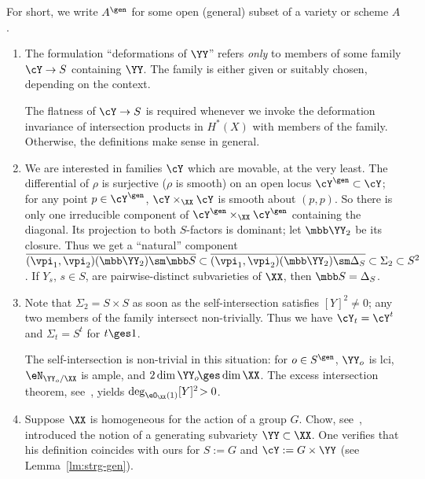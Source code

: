 \begin{m-definition}
\begin{aenum}
\item \label{d:YY-g-e}
  For short, we write $A^\gen$ for some open (general) subset of a variety or scheme $A$.
  \end{aenum}
\end{m-definition}


\begin{m-remark}\label{rmk:G} \leavevmode
  \begin{enumerate}
  \item\label{rmk:G-1} The formulation ``deformations of $\YY$'' refers \emph{only} to members of some family $\cY\to S$ containing $\YY$. The family is either given or suitably chosen, depending on the context. 


The flatness of $\cY\to S$ is required whenever we invoke the deformation invariance of intersection products in $H^*(X)$ with members of the family. Otherwise, the definitions make sense in general. 

\item\label{rmk:G-2} We are interested in families $\cY$ which are movable, at the very least. The differential of $\rho$ is surjective ($\rho$ is smooth) on an open locus $\cY^\gen\subset\cY$; for any point $p\in\cY^\gen$, $\cY\times_\XX\cY$ is smooth about $(p,p)$. So there is only one irreducible component of $\cY^\gen\times_\XX\cY^\gen$ containing the diagonal. Its projection to both $S$-factors is dominant; let $\mbb\YY_2$ be its closure. Thus we get a ``natural''  component $\overline{(\vpi_1,\vpi_2)(\mbb\YY_2)\sm\mbb S}\subset\overline{(\vpi_1,\vpi_2)(\mbb\YY_2)\sm\Delta_S}\subset\Sigma_2\subset S^2$. If $Y_s$, $s\in S$, are pairwise-distinct subvarieties of $\XX$, then $\mbb S=\Delta_S$.

\item\label{rmk:G-3} Note that $\Sigma_2=S\times S$ as soon as the self-intersection satisfies $[Y]^2\neq0$; any two members of the family intersect non-trivially. Thus we have $\cY_t=\cY^t$ and $\Sigma_t=S^t$ for $t\ges1$.

  The self-intersection is non-trivial in this situation: for $o\in S^\gen$, $\YY_o$ is lci, $\eN_{\YY_o/\XX}$ is ample, and  $2\dim\YY_o\!\ges\dim\XX$. The excess intersection theorem, see~\cite{fu-laz}, yields $\deg_{\eO_\XX(1)}[Y]^2\!>0$. 

\item\label{rmk:G-4} Suppose $\XX$ is homogeneous for the action of a group $G$. Chow, see~\cite{chow, dbar-mumford, bad}, introduced the notion of a generating subvariety $\YY\subset\XX$. One verifies that his definition coincides with ours for $S:=G$ and $\cY:=G\times \YY$ (see Lemma~\ref{lm:strg-gen}).
  \end{enumerate}
\end{m-remark}

